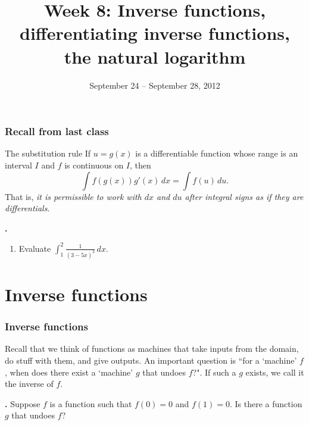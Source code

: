\documentclass[t]{beamer}
\title{Week 8:  Inverse functions, differentiating inverse functions, the natural logarithm}
\date{September 24 -- September 28, 2012}
\theoremstyle{plain}
\theoremstyle{definition}
\newcommand{\ds}{\displaystyle}
\newcounter{heading}
\newcommand{\newhead}[1]{\medskip\stepcounter{heading}\noindent\textbf{\hspace{0.2cm}{#1}.}}
\begin{document}
\frame{\titlepage}

\setcounter{tocdepth}{2}
\frame{\tableofcontents

\begin{flushright}
\end{flushright} 
}


\begin{frame}
\frametitle{Recall from last class}
\begin{block}{The substitution rule}
If $u = g(x)$ is a differentiable function whose range is an interval $I$ and $f$ is continuous on $I$, then
\[ \int f(g(x))g'(x)\,dx = \int f(u)\,du.\]
That is, \emph{it is permissible to work with $dx$ and $du$ after integral signs as if they are differentials}.
\end{block}\pause

\vspace*{.5cm}

\newhead{Example}
\begin{enumerate}[<+->]
\item Evaluate $\ds\int_{1}^{2}\frac{1}{(3-5x)^{2}}\,dx.$
\end{enumerate}
\end{frame}

\section{Inverse functions}

\begin{frame}
\frametitle{Inverse functions}
\noindent Recall that we think of functions as machines that take inputs from the domain, do stuff with them, and give outputs. An important question is ``for a `machine' $f$, when does there exist a `machine' $g$ that undoes $f$?".  If such a $g$ exists, we call it the inverse of $f$.  \pause

\vspace*{.5cm}

\newhead{Example} Suppose $f$ is a function such that $f(0)=0$ and $f(1)=0$. Is there a function $g$ that undoes $f$?
\end{frame}
\end{document}
